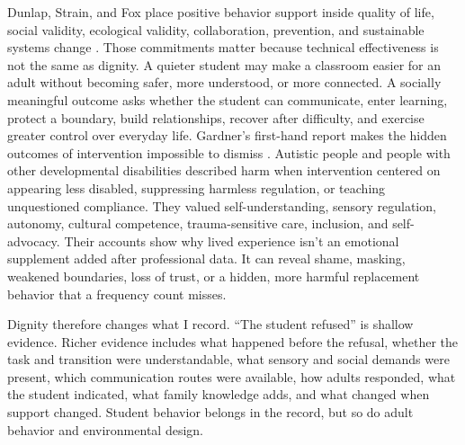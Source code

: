 
Dunlap, Strain, and Fox place positive behavior support inside quality of life, social validity, ecological validity, collaboration, prevention, and sustainable systems change \citep{dunlap2012pbs}. Those commitments matter because technical effectiveness is not the same as dignity. A quieter student may make a classroom easier for an adult without becoming safer, more understood, or more connected. A socially meaningful outcome asks whether the student can communicate, enter learning, protect a boundary, build relationships, recover after difficulty, and exercise greater control over everyday life. Gardner's first-hand report makes the hidden outcomes of intervention impossible to dismiss \citep{gardner2017firsthand}. Autistic people and people with other developmental disabilities described harm when intervention centered on appearing less disabled, suppressing harmless regulation, or teaching unquestioned compliance. They valued self-understanding, sensory regulation, autonomy, cultural competence, trauma-sensitive care, inclusion, and self-advocacy. Their accounts show why lived experience isn't an emotional supplement added after professional data. It can reveal shame, masking, weakened boundaries, loss of trust, or a hidden, more harmful replacement behavior that a frequency count misses.

Dignity therefore changes what I record. ``The student refused'' is shallow evidence. Richer evidence includes what happened before the refusal, whether the task and transition were understandable, what sensory and social demands were present, which communication routes were available, how adults responded, what the student indicated, what family knowledge adds, and what changed when support changed. Student behavior belongs in the record, but so do adult behavior and environmental design.


